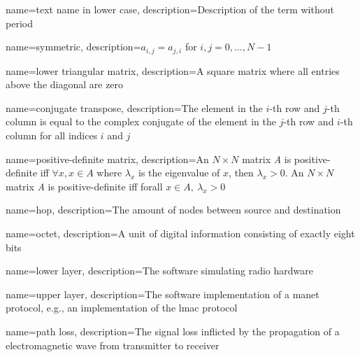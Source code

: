 \makenoidxglossaries
{}




{
    name={text name in lower case},
    description={Description of the term without period}
}

{
    name={symmetric},
    description={$a_{i,j} = a_{j,i}$ for $i, j = 0, \dots , N - 1$~\cite{Press:2007:NRE:1403886}}
}

{
    name={lower triangular matrix},
    description={A square matrix where all entries above the diagonal are zero~\cite{Press:2007:NRE:1403886}}
}

{
    name={conjugate transpose},
    description={The element in the $i$-th row and $j$-th column is equal to the complex conjugate of the element in the $j$-th row and $i$-th column for all indices $i$ and $j$~\cite{Press:2007:NRE:1403886}}
}

{
    name={positive-definite matrix},
    description={An $N \times N$ matrix \textit{A} is positive-definite iff $\forall x, x \in A$ where $\lambda_x$ is the eigenvalue of $x$, then $\lambda_x > 0$. 
    An $N \times N$ matrix \textit{A} is positive-definite iff forall $x \in A,\ \lambda_x > 0$~\cite{Press:2007:NRE:1403886}}
}

{
    name={hop},
    description={The amount of nodes between source and destination}
}

{
    name={octet},
    description={A unit of digital information consisting of exactly eight bits}
}

{
    name={lower layer},
    description={The software simulating radio hardware}
}

{
    name={upper layer},
    description={The software implementation of a \acrshort{manet} protocol, e.g., an implementation of the \acrshort{lmac} protocol}
}

{
    name={path loss},
    description={The signal loss inflicted by the propagation of a electromagnetic wave from transmitter to receiver~\cite[p.~10]{paper:linkmodel}}
}